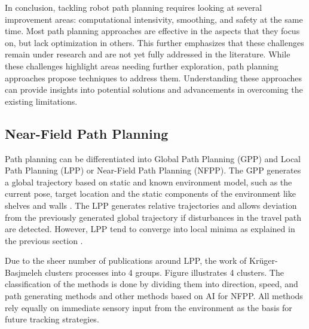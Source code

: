 In conclusion, tackling robot path planning requires looking at several improvement
areas: computational intensivity, smoothing, and safety at the same time. Most path planning approaches 
are effective in the aspects that they focus on, but lack optimization in others. This further emphasizes that these 
challenges remain under research and are not yet fully addressed in the literature. While these challenges 
highlight areas needing further exploration, path planning approaches propose techniques 
to address them. Understanding these approaches can provide insights into potential solutions and 
advancements in overcoming the existing limitations.


\subsection{Near-Field Path Planning}
Path planning can be differentiated into Global Path Planning (GPP) and Local
Path Planning (LPP) or Near-Field Path Planning (NFPP). The GPP generates a global trajectory based on static and 
known environment model, such as the current pose, target location and the static components 
of the environment like shelves and walls \cite{R28}. 
The LPP generates relative trajectories and allows deviation from the previously generated global 
trajectory if disturbances in the travel path are detected. However, LPP tend to converge into local 
minima as explained in the previous section .

Due to the sheer number of publications around LPP, the work of  Kr\"uger-Basjmeleh \cite{R28} clusters 
processes into 4 groups. Figure  illustrates 4 clusters. 
The classification of the methods is done by dividing them into direction, speed, and path generating methods and 
other methods based on AI for NFPP. All methods rely equally on immediate sensory input from the 
environment as the basis for future tracking strategies.

